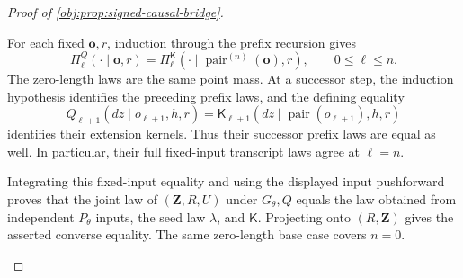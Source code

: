 \begin{proof}[Proof of \cref{obj:prop:signed-causal-bridge}]
\begin{enumerate}
For each fixed \(\mathbf o,r\), induction through the prefix recursion
gives
\[
\Pi_\ell^Q(\cdot\mid\mathbf o,r)
=\Pi_\ell^{\mathsf K}
(\cdot\mid\operatorname{pair}^{(n)}(\mathbf o),r),
\qquad 0\le\ell\le n.
\]
The zero-length laws are the same point mass. At a successor step,
the induction hypothesis identifies the preceding prefix laws, and
the defining equality
\[
Q_{\ell+1}(dz\mid o_{\ell+1},h,r)
=\mathsf K_{\ell+1}
(dz\mid\operatorname{pair}(o_{\ell+1}),h,r)
\]
identifies their extension kernels. Thus their successor prefix laws
are equal as well. In particular, their full fixed-input transcript
laws agree at \(\ell=n\).

Integrating this fixed-input equality and using the displayed input
pushforward proves that the joint law of \((\mathbf Z,R,U)\) under
\(G_\theta,Q\) equals the law obtained from independent \(P_\theta\)
inputs, the seed law \(\lambda\), and \(\mathsf K\). Projecting onto
\((R,\mathbf Z)\) gives the asserted converse equality. The same
zero-length base case covers \(n=0\).
\end{enumerate}
\end{proof}

